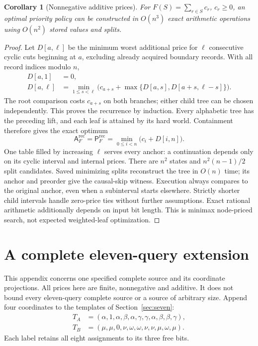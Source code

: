 \documentclass[pdflatex,sn-mathphys-num]{sn-jnl}
\newcommand{\A}{\mathsf{A}}
\newcommand{\Pcost}{\mathsf{P}}
\theoremstyle{thmstyleone}
\newtheorem{corollary}[theorem]{Corollary}
\theoremstyle{thmstylethree}
\theoremstyle{thmstyletwo}
\begin{document}
\begin{corollary}[Nonnegative additive prices]\label{cor:record-path-additive}
For $F(S)=\sum_{r\in S}c_r$, $c_r\geq0$, an optimal priority policy can be constructed in $O(n^3)$ exact arithmetic operations using $O(n^2)$ stored values and splits.
\end{corollary}
\begin{proof}
Let $D[a,\ell]$ be the minimum worst additional price for $\ell$ consecutive cyclic cuts beginning at $a$, excluding already acquired boundary records. With all record indices modulo $n$,
\begin{align*}
 D[a,1]&=0,\\
 D[a,\ell]&=\min_{1\leq s<\ell}
 \bigl(c_{a+s}+\max\{D[a,s],D[a+s,\ell-s]\}\bigr).
\end{align*}
The root comparison costs $c_{a+s}$ on both branches; either child tree can be chosen independently. This proves the recurrence by induction. Every alphabetic tree has the preceding lift, and each leaf is attained by its hard world. Containment therefore gives the exact optimum
\[
 \A_F^{\mathrm{rec}}=\Pcost_F^{\mathrm{rec}}
 =\min_{0\leq i<n}\bigl(c_i+D[i,n]\bigr).
\]
One table filled by increasing $\ell$ serves every anchor: a continuation depends only on its cyclic interval and internal prices. There are $n^2$ states and $n^2(n-1)/2$ split candidates. Saved minimizing splits reconstruct the tree in $O(n)$ time; its anchor and preorder give the causal-skip witness. Execution always compares to the original anchor, even when a subinterval starts elsewhere. Strictly shorter child intervals handle zero-price ties without further assumptions. Exact rational arithmetic additionally depends on input bit length. This is minimax node-priced search, not expected weighted-leaf optimization.
\end{proof}

\section{A complete eleven-query extension}\label{app:full11-copy-pin}

This appendix concerns one specified complete source and its coordinate
projections. All prices here are finite, nonnegative and additive. It does not
bound every eleven-query complete source or a source of arbitrary size.
Append four coordinates to the templates of Section~\ref{sec:seven}:
\begin{align*}
 T_A&=(\alpha,1,\alpha,\beta,\alpha,\gamma,\gamma,
             \alpha,\beta,\beta,\gamma),\\
 T_B&=(\mu,\mu,0,\nu,\omega,\omega,\nu,
             \nu,\mu,\omega,\mu).
\end{align*}
Each label retains all eight assignments to its three free bits.
\end{document}
